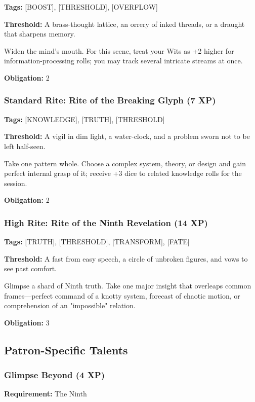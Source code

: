 \textbf{Tags:} [BOOST], [THRESHOLD], [OVERFLOW]

\textbf{Threshold:} A brass-thought lattice, an orrery of inked threads, or a draught that sharpens memory.

Widen the mind's mouth. For this scene, treat your Wits as +2 higher for information-processing rolls; you may track several intricate streams at once.

\textbf{Obligation:} 2

\subsubsection{Standard Rite: Rite of the Breaking Glyph (7 XP)}

\textbf{Tags:} [KNOWLEDGE], [TRUTH], [THRESHOLD]

\textbf{Threshold:} A vigil in dim light, a water-clock, and a problem sworn not to be left half-seen.

Take one pattern whole. Choose a complex system, theory, or design and gain perfect internal grasp of it; receive +3 dice to related knowledge rolls for the session.

\textbf{Obligation:} 2

\subsubsection{High Rite: Rite of the Ninth Revelation (14 XP)}

\textbf{Tags:} [TRUTH], [THRESHOLD], [TRANSFORM], [FATE]

\textbf{Threshold:} A fast from easy speech, a circle of unbroken figures, and vows to see past comfort.

Glimpse a shard of Ninth truth. Take one major insight that overleaps common frames—perfect command of a knotty system, forecast of chaotic motion, or comprehension of an "impossible" relation.

\textbf{Obligation:} 3

\subsection{Patron-Specific Talents}

\subsubsection{Glimpse Beyond (4 XP)}

\textbf{Requirement:} The Ninth

